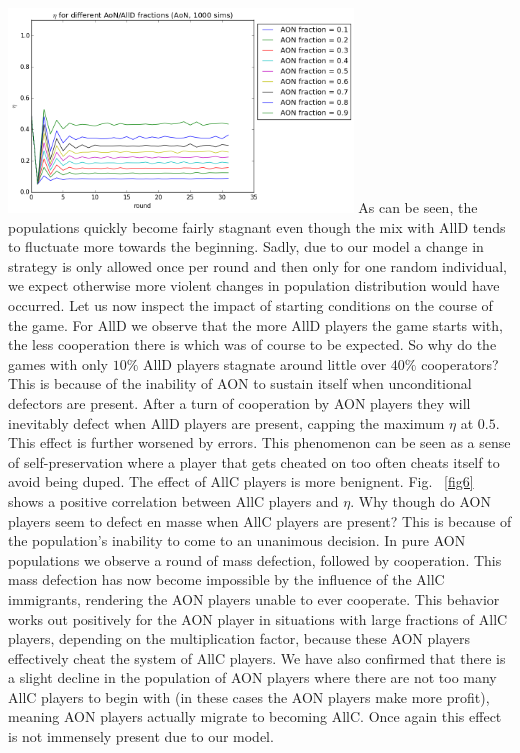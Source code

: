 \documentclass[letterpaper]{article}
\begin{document}
\includegraphics[width=3.6in,angle=0]{img/cfraction_AONAllDfractions_aon.png}
\label{fig7}
\vspace{5 mm}
As can be seen, the populations quickly become fairly stagnant even though the mix with AllD tends to fluctuate more towards the beginning. Sadly, due to our model a change in strategy is only allowed once per round and then only for one random individual, we expect otherwise more violent changes in population distribution would have occurred. Let us now inspect the impact of starting conditions on the course of the game. For AllD we observe that the more AllD players the game starts with, the less cooperation there is which was of course to be expected. So why do the games with only $10\%$ AllD players stagnate around little over $40\%$ cooperators? This is because of the inability of AON to sustain itself when unconditional defectors are present. After a turn of cooperation by AON players they will inevitably defect when AllD players are present, capping the maximum $\eta$ at $0.5$. This effect is further worsened by errors. This phenomenon can be seen as a sense of self-preservation where a player that gets cheated on too often cheats itself to avoid being duped.  The effect of AllC players is more benignent. Fig. ~\ref{fig6} shows a positive correlation between AllC players and $\eta$. Why though do AON players seem to defect en masse when AllC players are present? This is because of the population's inability to come to an unanimous decision. In pure AON populations we observe a round of mass defection, followed by cooperation. This mass defection has now become impossible by the influence of the AllC immigrants, rendering the AON players unable to ever cooperate. This behavior works out positively for the AON player in situations with large fractions of AllC players, depending on the multiplication factor, because these AON players effectively cheat the system of AllC players.
We have also confirmed that there is a slight decline in the population of AON players where there are not too many AllC players to begin with (in these cases the AON players make more profit), meaning AON players actually migrate to becoming AllC. Once again this effect is not immensely present due to our model. 
	
\end{document}
